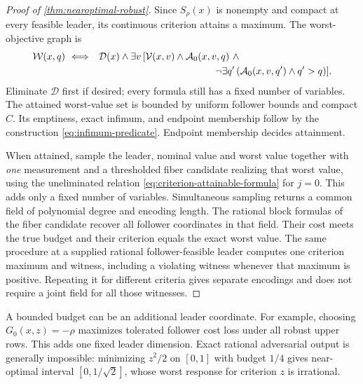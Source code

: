 \begin{proof}[Proof of \cref{thm:nearoptimal-robust}]
Since $S_\rho(x)$ is nonempty and compact at every feasible leader,
its continuous criterion attains a maximum. The worst-objective graph is
\begin{equation}\label{eq:robust-worst-formula}
 \begin{split}
 \mathcal W(x,q)\ \Longleftrightarrow\quad&\mathcal D(x)\wedge
 \exists v\,[\mathcal V(x,v)\wedge\mathcal A_0(x,v,q)\ \wedge\\
 &\hspace{42mm}\neg\exists q'\,
              (\mathcal A_0(x,v,q')\wedge q'>q)].
 \end{split}
\end{equation}
Eliminate $\mathcal D$ first if desired; every formula still has a
fixed number of variables. The attained worst-value set is bounded by
uniform follower bounds and compact $C$. Its emptiness, exact infimum,
and endpoint membership follow by the construction
\eqref{eq:infimum-predicate}. Endpoint membership decides attainment.

When attained, sample the leader, nominal value and worst value together
with \emph{one} measurement and a thresholded fiber candidate realizing
that worst value, using the uneliminated relation
\eqref{eq:criterion-attainable-formula} for $j=0$. This adds only a
fixed number of variables. Simultaneous sampling returns a common field
of polynomial degree and encoding length. The rational block formulas
of the fiber candidate recover all follower coordinates in that field.
Their cost meets the true budget and their criterion equals the exact
worst value. The same procedure at a supplied rational follower-feasible
leader computes one criterion maximum and witness, including a violating
witness whenever that maximum is positive. Repeating it for different
criteria gives separate encodings and does not require a joint field
for all those witnesses.
\end{proof}

A bounded budget can be an additional leader coordinate. For example,
choosing $G_0(x,z)=-\rho$ maximizes tolerated follower cost loss under
all robust upper rows. This adds one fixed leader dimension. Exact
rational adversarial output is generally impossible: minimizing $z^2/2$
on $[0,1]$ with budget $1/4$ gives near-optimal interval
$[0,1/\sqrt2]$, whose worst response for criterion $z$ is irrational.

